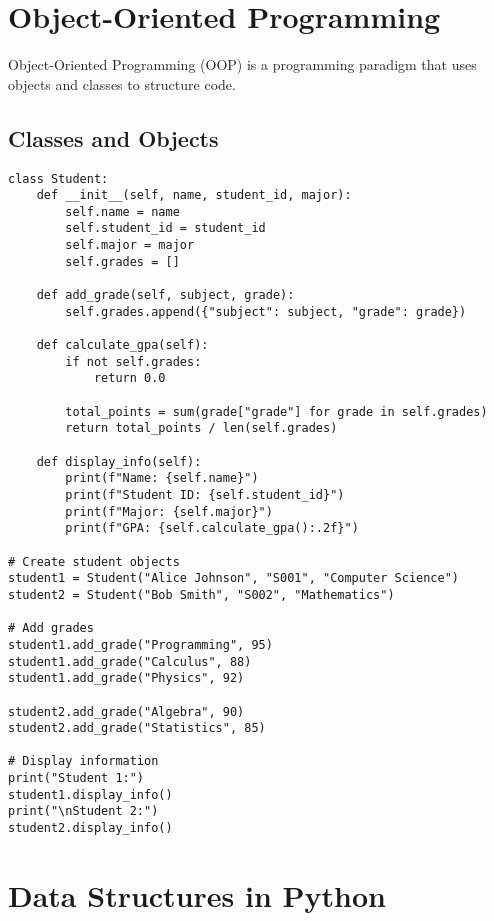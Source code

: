 \documentclass[12pt,a4paper]{article}
\begin{document}
\section{Object-Oriented Programming}

Object-Oriented Programming (OOP) is a programming paradigm that uses objects and classes to structure code.

\subsection{Classes and Objects}

\begin{codebox}{}
\begin{lstlisting}[style=python]
class Student:
    def __init__(self, name, student_id, major):
        self.name = name
        self.student_id = student_id
        self.major = major
        self.grades = []
    
    def add_grade(self, subject, grade):
        self.grades.append({"subject": subject, "grade": grade})
    
    def calculate_gpa(self):
        if not self.grades:
            return 0.0
        
        total_points = sum(grade["grade"] for grade in self.grades)
        return total_points / len(self.grades)
    
    def display_info(self):
        print(f"Name: {self.name}")
        print(f"Student ID: {self.student_id}")
        print(f"Major: {self.major}")
        print(f"GPA: {self.calculate_gpa():.2f}")

# Create student objects
student1 = Student("Alice Johnson", "S001", "Computer Science")
student2 = Student("Bob Smith", "S002", "Mathematics")

# Add grades
student1.add_grade("Programming", 95)
student1.add_grade("Calculus", 88)
student1.add_grade("Physics", 92)

student2.add_grade("Algebra", 90)
student2.add_grade("Statistics", 85)

# Display information
print("Student 1:")
student1.display_info()
print("\nStudent 2:")
student2.display_info()
\end{lstlisting}
\end{codebox}

\section{Data Structures in Python}
\end{document}
